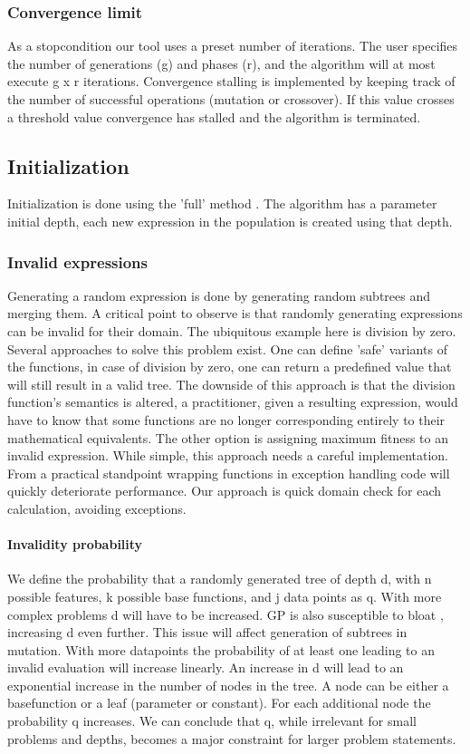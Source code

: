 \subsubsection{Convergence limit}
As a stopcondition our tool uses a preset number of iterations. The user specifies the number of generations (g) and phases (r), and the algorithm will at most execute g x r iterations. Convergence stalling is implemented by keeping track of the number of successful operations (mutation or crossover). If this value crosses a threshold value convergence has stalled and the algorithm is terminated.


\subsection{Initialization}
Initialization is done using the 'full' method \cite{GP}. The algorithm has a parameter initial depth, each new expression in the population is created using that depth.
 
\subsubsection{Invalid expressions}\label{subsubinvalidexpressions}
Generating a random expression is done by generating random subtrees and merging them. A critical point to observe is that randomly generating expressions can be invalid for their domain. The ubiquitous example here is division by zero. Several approaches to solve this problem exist. One can define 'safe' variants of the functions, in case of division by zero, one can return a predefined value that will still result in a valid tree. The downside of this approach is that the division function's semantics is altered, a practitioner, given a resulting expression, would have to know that some functions are no longer corresponding entirely to their mathematical equivalents. 
The other option is assigning maximum fitness to an invalid expression. While simple, this approach needs a careful implementation. From a practical standpoint wrapping functions in exception handling code will quickly deteriorate performance. 
Our approach is quick domain check for each calculation, avoiding exceptions.

\paragraph{Invalidity probability}
We define the probability that a randomly generated tree of depth d, with n possible features, k possible base functions, and j data points as q. With more complex problems d will have to be increased. GP is also susceptible to bloat \cite{GPBloat}, increasing d even further. This issue will affect generation of subtrees in mutation. With more datapoints the probability of at least one leading to an invalid evaluation will increase linearly. An increase in d will lead to an exponential increase in the number of nodes in the tree. A node can be either a basefunction or a leaf (parameter or constant). For each additional node the probability q increases. We can conclude that q, while irrelevant for small problems and depths, becomes a major constraint for larger problem statements. 

